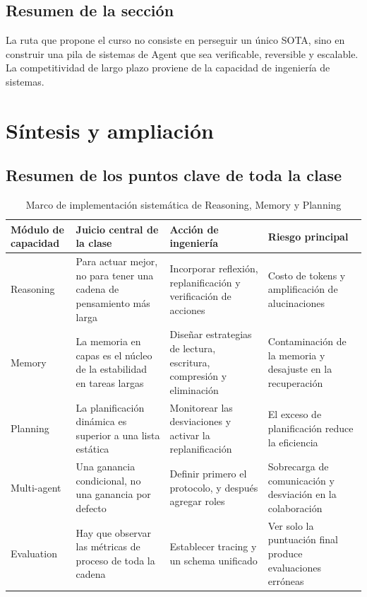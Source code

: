 \documentclass[a4paper]{article}
\begin{document}
\subsection{Resumen de la sección}
La ruta que propone el curso no consiste en perseguir un único SOTA, sino en construir una pila de sistemas de Agent que sea verificable, reversible y escalable. La competitividad de largo plazo proviene de la capacidad de ingeniería de sistemas.

\section{Síntesis y ampliación}

\subsection{Resumen de los puntos clave de toda la clase}
\begin{table}[H]
\centering
\begin{tabular}{p{2.5cm}p{3.7cm}p{3.8cm}p{2.6cm}}
\toprule
\textbf{Módulo de capacidad} & \textbf{Juicio central de la clase} & \textbf{Acción de ingeniería} & \textbf{Riesgo principal} \\
\midrule
Reasoning & Para actuar mejor, no para tener una cadena de pensamiento más larga & Incorporar reflexión, replanificación y verificación de acciones & Costo de tokens y amplificación de alucinaciones \\
Memory & La memoria en capas es el núcleo de la estabilidad en tareas largas & Diseñar estrategias de lectura, escritura, compresión y eliminación & Contaminación de la memoria y desajuste en la recuperación \\
Planning & La planificación dinámica es superior a una lista estática & Monitorear las desviaciones y activar la replanificación & El exceso de planificación reduce la eficiencia \\
Multi-agent & Una ganancia condicional, no una ganancia por defecto & Definir primero el protocolo, y después agregar roles & Sobrecarga de comunicación y desviación en la colaboración \\
Evaluation & Hay que observar las métricas de proceso de toda la cadena & Establecer tracing y un schema unificado & Ver solo la puntuación final produce evaluaciones erróneas \\
\bottomrule
\end{tabular}
\caption{Marco de implementación sistemática de Reasoning, Memory y Planning}
\end{table}
\end{document}
